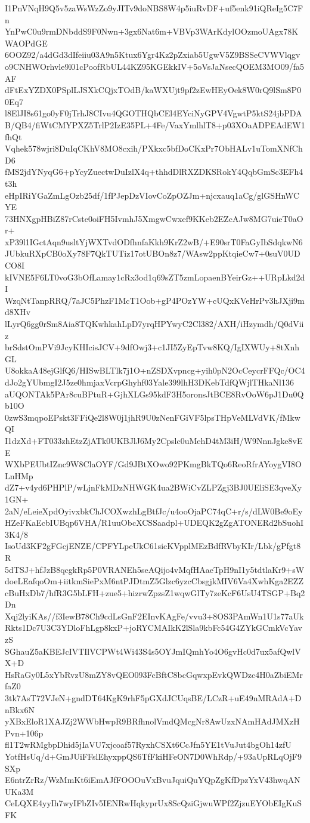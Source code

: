 I1PnVNqH9Q5v5zaWsWzZo9yJITv9doNBS8W4p5iuRvDF+uf5enk91iQReIg5C7Fn
YnPwC0u9rmDNbddS9F0Nwn+3gx6Nat6m+VBVp3WArKdylOOzmoUAgx78KWAOPdGE
6OOZ92/a4dGd3dIfeiiu03A9n5Ktux6Ygr4Kz2pZxiab5UgwV5Z9BSSeCVWVlqgv
o9CNHWOrhvle9l01cPoofRbUL44KZ95KGEkkIV+5oVsJaNsecQOEM3MO09/fa5AF
dFtExYZDX0PSplLJSXkCQjxTOdB/kaWXUjt9pf2zEwHEyOek8W0rQ9lSm8P00Eq7
l8ElJI8s61go0yF0jTrhJ8CIvu4QGOTHQbCEl4EYciNyGPV4VgwtP5ktS24jbPDA
B/QB4/fiWtCMYPXZ5TrlP2IzE35PL+4Fe/VaxYmlhlT8+p03XOaADPEAdEW1fhQt
Vqhek578wjri8DuIqCKhV8MO8cxih/PXkxc5bfDoCKxPr7ObHALv1uTomXNfChD6
fMS2jdYNyqG6+pYcyZuectwDuIzlX4q+thhdDlRXZDKSRokY4QqbGmSc3EFh4t3h
eHpIRiYGaZmLgOzb25df/1fPJepDzVIovCoZpOZJm+njcxauq1aCg/glGSHnWCYE
73HNXgpHBiZ87rCste0oiFH5IvmhJ5XmgwCwxef9KKeb2EZcAJw8MG7uieT0aOr+
xP39l1IGctAqn9usltYjWXTvdODfhnfaKkh9KrZ2wB/+E90srT0FaGyIbSdqkwN6
JUbkuRXpCB0oXy78F7QkTUTiz17otUBOn8z7/WAsw2ppKtqieCw7+0suV0UDCO8I
kIVNE5F6LT0voG3bOfLamay1cRx3od1q69sZT5zmLopaenBYeirGz++URpLkd2dI
WzqNtTanpRRQ/7aJC5PhzF1McT1Oob+gP4POzYW+cUQxKVeHrPv3hJXji9md8XHv
lLyrQ6gg0rSm8Aia8TQKwhkahLpD7yrqHPYwyC2Cl382/AXH/iHzymdh/Q0dViiz
brSdstOmPVi9JcyKHIcisJCV+9dfOwj3+c1JI5ZyEpTvw8KQ/IgIXWUy+8tXnhGL
U8okkaA48ejGlfQ6/HISwBLTlk7j1O+nZSDXvpncg+yih0pN2OcCeycrFFQc/OC4
dJo2gYUbmgI2J5ze0hmjaxVcrpGhyhf03Yale399lhH3DKebTdfQWjlTHkaNl136
aUQONTAk5PAr8cuBPtuR+GjhXLGs95kdF3H5oronsJtBCE8RvOoW6pJ1Du0Qb10O
0zwS3mqpoEPskt3FFiQe2l8W0j1jhR9U0zNenFGiVF5lpsTHpVeMLVdVK/fMkwQI
I1dzXd+FT033zhEtzZjATk0UKBJlJ6My2Cpslc0uMehD4tM3iH/W9NnnJgke8vEE
WXbPEUbtIZnc9W8ClaOYF/Gd9JBtXOwo92PKmgBkTQo6ReoRfrAYoygVI8OLnHMp
dZ7+v4yd6PHPlP/wLjnFkMDzNHWGK4ua2BWiCvZLPZgj3BJ0UEliSE3qveXy1GN+
2aN/eLeieXpdOyivxbkChJCOXwzhLgBtfJc/u4ooOjaPC74qC+r/s/dLW0Be9oEy
HZeFKaEcbIUBqp6VHA/R1uuObcXCSSaadpl+UDEQK2gZgATONERd2bSuohI3K4/8
IsoUd3KF2gFGcjENZE/CPFYLpeUkC61sicKVpplMEzBdfRVbyKIr/Lbk/gPfgt8R
5dTSJ+hfJzB8qcgkRp5P0VRANEh5seAQijo4vMqfHAaeTpH9nI1y5tdtlaKr9+sW
doeLEafqoOm+iitkmSiePxM6ntPJDtmZ5Glzc6yzcCbsgjkMIV6Va4XwhKga2EZZ
cBuHxDb7/hfR3G5bLFH+zue5+hizrwZpzsZ1wqwGlTy7zeKcF6UsU4TSGP+Bq2Dn
Xqj2lyiKAs//f3IewB78Ch9cdLsGnF2EInvKAgFe/vvu3+8OS3PAmWn1U1s77aUk
Rkts1Dc7U3C3YDloFhLgp8kxP+joRYCMAIkK2lSla9kbFc54G4ZYkGCmkVcYavzS
SGhauZ5aKBEJcIVTIlVCPWt4Wi43S4s5OYJmIQmhYo4O6gvHc0d7ux5afQwlVX+D
HsRaGy0L5xYbRvzU8mZY8vQEO093FcBftC8bcGqwxpEvkQWDzc4H0aZbiEMrfaZ0
3tk7AsT72VJeN+gndDT64KgK9rhF5pGXdJCUqsBE/LCzR+uE49nMRAdA+DnBkx6N
yXBxEloR1XAJZj2WWbHwpR9BRfhnolVmdQMcgNr8AwUzxNAmHAdJMXzHPvn+106p
fl1T2wRMgbpDhid5jIaVU7xjcoaf57RyxhCSXt6CcJfn5YE1tVuJut4bgOh14zfU
YotfHsUq/d+GmJUiFFslEhyxppQS6TfFkiHFeON7D0WhRdp/+93aUpRLqOjF9SXp
E6ntrZrRz/WzMmKt6iEmAJfFOOOuVxBvuJquiQuYQpZgKfDpzYxV43hwqANUKa3M
CeLQXE4yyIh7wyIFbZIv5IENRwHqkyprUx8ScQziGjwuWPf2ZjzuEYObEIgKuSFK
